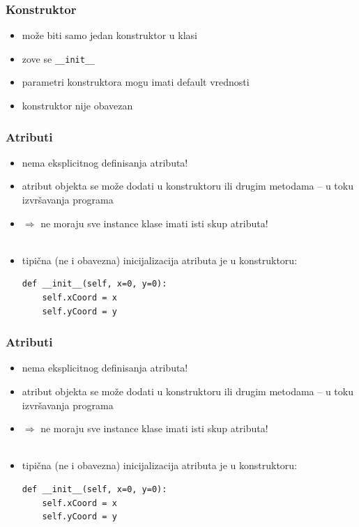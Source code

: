 \documentclass[compress]{beamer}
\begin{document}
\begin{frame}[fragile]
\frametitle{Konstruktor}
\begin{itemize}
  \item može biti samo jedan konstruktor u klasi
  \item zove se \texttt{\_\_init\_\_}
  \item parametri konstruktora mogu imati default vrednosti
  \item konstruktor nije obavezan
\end{itemize}
\end{frame}

\begin{frame}[fragile]
\frametitle{Atributi}
\begin{itemize}
  \item nema eksplicitnog definisanja atributa!
  \item atribut objekta se može dodati u konstruktoru ili drugim metodama -- u toku izvršavanja programa
  \item $\Rightarrow$ ne moraju sve instance klase imati isti skup atributa! \\ \ \\
  \item tipična (ne i obavezna) inicijalizacija atributa je u konstruktoru:
\begin{verbatim}
def __init__(self, x=0, y=0):
    self.xCoord = x
    self.yCoord = y
\end{verbatim}
\end{itemize}
\end{frame}

\begin{frame}[fragile]
\frametitle{Atributi}
\begin{itemize}
  \item nema eksplicitnog definisanja atributa!
  \item atribut objekta se može dodati u konstruktoru ili drugim metodama -- u toku izvršavanja programa
  \item $\Rightarrow$ ne moraju sve instance klase imati isti skup atributa! \\ \ \\
  \item tipična (ne i obavezna) inicijalizacija atributa je u konstruktoru:
\begin{verbatim}
def __init__(self, x=0, y=0):
    self.xCoord = x
    self.yCoord = y
\end{verbatim}
\end{itemize}
\end{frame}
\end{document}
